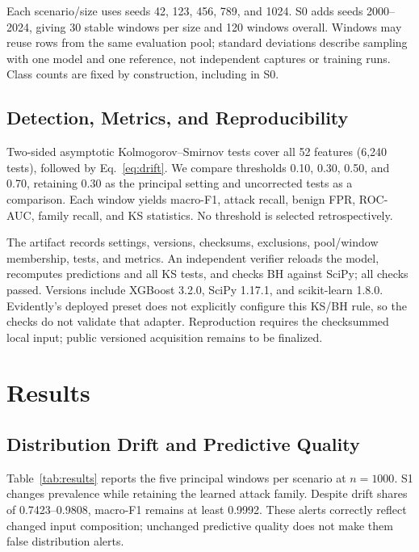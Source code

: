 \documentclass[runningheads]{llncs}
\begin{document}
Each scenario/size uses seeds 42, 123, 456, 789, and 1024. S0 adds seeds 2000--2024, giving 30 stable windows per size and 120 windows overall. Windows may reuse rows from the same evaluation pool; standard deviations describe sampling with one model and one reference, not independent captures or training runs. Class counts are fixed by construction, including in S0.

\subsection{Detection, Metrics, and Reproducibility}
Two-sided asymptotic Kolmogorov--Smirnov tests cover all 52 features (6,240 tests), followed by Eq.~\ref{eq:drift}. We compare thresholds 0.10, 0.30, 0.50, and 0.70, retaining 0.30 as the principal setting and uncorrected tests as a comparison. Each window yields macro-F1, attack recall, benign FPR, ROC-AUC, family recall, and KS statistics. No threshold is selected retrospectively.

The artifact records settings, versions, checksums, exclusions, pool/window membership, tests, and metrics. An independent verifier reloads the model, recomputes predictions and all KS tests, and checks BH against SciPy; all checks passed. Versions include XGBoost 3.2.0, SciPy 1.17.1, and scikit-learn 1.8.0. Evidently's deployed preset does not explicitly configure this KS/BH rule, so the checks do not validate that adapter. Reproduction requires the checksummed local input; public versioned acquisition remains to be finalized.

\section{Results}
\label{sec:results}
\subsection{Distribution Drift and Predictive Quality}
Table~\ref{tab:results} reports the five principal windows per scenario at $n=1000$. S1 changes prevalence while retaining the learned attack family. Despite drift shares of 0.7423--0.9808, macro-F1 remains at least 0.9992. These alerts correctly reflect changed input composition; unchanged predictive quality does not make them false distribution alerts.
\end{document}
